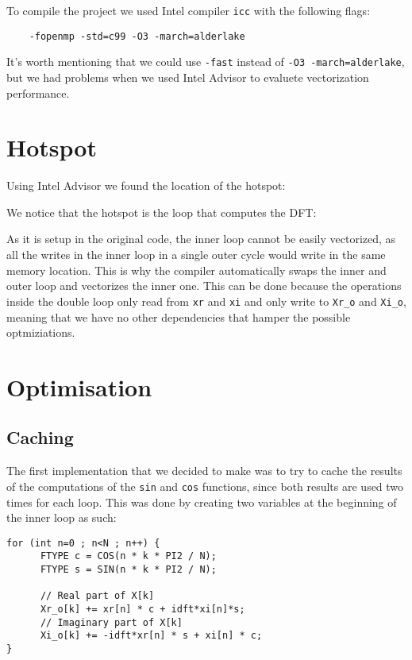 \documentclass{article}
\begin{document}
To compile the project we used Intel compiler \texttt{icc} with the following flags: 
\begin{verbatim}
    -fopenmp -std=c99 -O3 -march=alderlake
\end{verbatim}
It's worth mentioning that we could use \verb|-fast| instead of \verb|-O3 -march=alderlake|, but we had problems when we used Intel Advisor to evaluete vectorization performance.

\section{Hotspot}
Using Intel Advisor we found the location of the hotspot:


We notice that the hotspot is the loop that computes the DFT:


As it is setup in the original code, the inner loop cannot be easily vectorized, as all the writes in the inner loop in a single outer cycle would write in the same memory location. This is why the compiler automatically swaps the inner and outer loop and vectorizes the inner one. This can be done because the operations inside the double loop only read from \verb|xr| and \verb|xi| and only write to \verb|Xr_o| and \verb|Xi_o|, meaning that we have no other dependencies that hamper the possible optmiziations.

\section{Optimisation}

\subsection{Caching}

The first implementation that we decided to make was to try to cache the results of the computations of the \verb|sin| and \verb|cos| functions, since both results are used two times for each loop. This was done by creating two variables at the beginning of the inner loop as such:
\begin{verbatim}
for (int n=0 ; n<N ; n++) {
      FTYPE c = COS(n * k * PI2 / N);
      FTYPE s = SIN(n * k * PI2 / N);

      // Real part of X[k]
      Xr_o[k] += xr[n] * c + idft*xi[n]*s;
      // Imaginary part of X[k]
      Xi_o[k] += -idft*xr[n] * s + xi[n] * c;
}
\end{verbatim}
\end{document}
